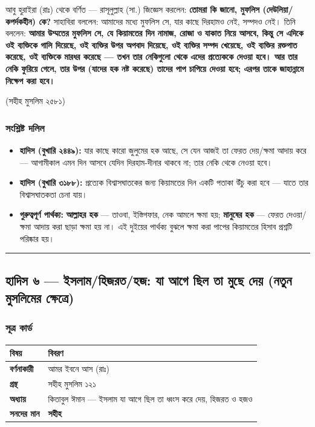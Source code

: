 আবু হুরাইরা (রাঃ) থেকে বর্ণিত — রাসূলুল্লাহ (সা.) জিজ্ঞেস করলেন: \textbf{তোমরা কি জানো, মুফলিস (দেউলিয়া/কপর্দকহীন) কে?} সাহাবিরা বললেন: আমাদের মধ্যে মুফলিস সে, যার কাছে দিরহামও নেই, সম্পদও নেই। তিনি বললেন: \textbf{আমার উম্মতের মুফলিস সে, যে কিয়ামতের দিন নামাজ, রোজা ও যাকাত নিয়ে আসবে, কিন্তু সে এদিকে ওই ব্যক্তিকে গালি দিয়েছে, ওই ব্যক্তির উপর অপবাদ দিয়েছে, ওই ব্যক্তির সম্পদ খেয়েছে, ওই ব্যক্তির রক্তপাত করেছে, ওই ব্যক্তিকে মারধর করেছে — তখন তার নেকিগুলো থেকে এদের প্রত্যেককে দেওয়া হবে। আর তার নেকি ফুরিয়ে গেলে, তার উপর (যাদের হক নষ্ট করেছে) তাদের পাপ চাপিয়ে দেওয়া হবে; এরপর তাকে জাহান্নামে নিক্ষেপ করা হবে।}

(সহীহ মুসলিম ২৫৮১)

\subsubsection*{সংশ্লিষ্ট দলিল}

\begin{itemize}
\item \textbf{হাদিস (বুখারি ২৪৪৯):} যার কাছে কারো জুলুমের হক আছে, সে যেন আজই তা ফেরত দেয়/ক্ষমা আদায় করে — আগামীকাল এমন দিন আসবে যেদিন দিরহাম-দীনার থাকবে না; তার নেকি থেকে নেওয়া হবে।
\item \textbf{হাদিস (বুখারি ৩১৮৮):} প্রত্যেক বিশ্বাসঘাতকের জন্য কিয়ামতের দিন একটি পতাকা উঁচু করা হবে — যাতে তার বিশ্বাসঘাতকতা চেনা যায়।
\item \textbf{গুরুত্বপূর্ণ পার্থক্য:} \textbf{আল্লাহর হক} — তাওবা, ইস্তিগফার, নেক আমলে ক্ষমা হয়; \textbf{মানুষের হক} — ফেরত দেওয়া/ক্ষমা আদায় করা ছাড়া ক্ষমা হয় না। এই দুইয়ের পার্থক্য বুঝলে ক্ষমা করা পাপের কিয়ামতের হিসাব প্রশ্নটি পরিষ্কার হয়।
\end{itemize}
\medskip\hrule\medskip

\subsection*{হাদিস ৬ — ইসলাম/হিজরত/হজ: যা আগে ছিল তা মুছে দেয় (নতুন মুসলিমের ক্ষেত্রে)}

\subsubsection*{সূত্র কার্ড}

\begin{table}[h]\centering\small
\begin{tabular}{ll}
বিষয় & বিবরণ \\
\hline
\textbf{বর্ণনাকারী} & আমর ইবনে আস (রাঃ) \\
\textbf{গ্রন্থ} & সহীহ মুসলিম ১২১ \\
\textbf{অধ্যায়} & কিতাবুল ঈমান — \lat{“}ইসলাম যা আগে ছিল তা ধ্বংস করে দেয়, হিজরত ও হজও\lat{”} \\
\textbf{সনদের মান} & \textbf{সহীহ} \\
\hline
\end{tabular}
\end{table}

